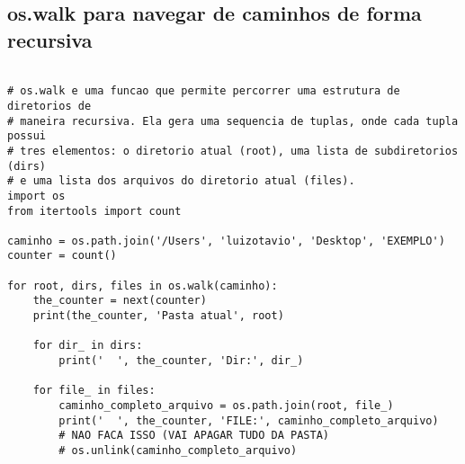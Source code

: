 \documentclass{article}
\begin{document}
\subsection{ os.walk para navegar de caminhos de forma recursiva}
\begin{lstlisting}
    
# os.walk e uma funcao que permite percorrer uma estrutura de diretorios de
# maneira recursiva. Ela gera uma sequencia de tuplas, onde cada tupla possui
# tres elementos: o diretorio atual (root), uma lista de subdiretorios (dirs)
# e uma lista dos arquivos do diretorio atual (files).
import os
from itertools import count

caminho = os.path.join('/Users', 'luizotavio', 'Desktop', 'EXEMPLO')
counter = count()

for root, dirs, files in os.walk(caminho):
    the_counter = next(counter)
    print(the_counter, 'Pasta atual', root)

    for dir_ in dirs:
        print('  ', the_counter, 'Dir:', dir_)

    for file_ in files:
        caminho_completo_arquivo = os.path.join(root, file_)
        print('  ', the_counter, 'FILE:', caminho_completo_arquivo)
        # NAO FACA ISSO (VAI APAGAR TUDO DA PASTA)
        # os.unlink(caminho_completo_arquivo)
\end{lstlisting}
\end{document}
